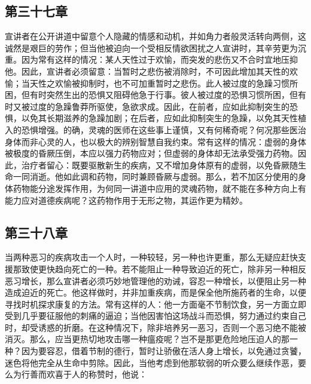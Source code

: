 
\subsection{第三十七章}

\par

宣讲者在公开讲道中留意个人隐藏的情感和动机，并如角力者般灵活转向两侧，这诚然是艰巨的劳作；但当他被迫向一个受相反情欲困扰之人宣讲时，其辛劳更为沉重。因为常有这样的情况：某人天性过于欢愉，而突发的悲伤又不合时宜地压抑他。因此，宣讲者必须留意：当暂时之悲伤被消除时，不可因此增加其天性的欢愉；当天性之欢愉被抑制时，也不可加重暂时之悲伤。此人被过度的急躁习惯所困，但有时突然生出的恐惧又阻碍他急于行事。彼人被过度的恐惧习惯所困，但有时又被过度的急躁鲁莽所驱使，急欲求成。因此，在前者，应如此抑制突生的恐惧，以免其长期滋养的急躁加剧；在后者，应如此抑制突生的急躁，以免其天性植入的恐惧增强。的确，灵魂的医师在这些事上谨慎，又有何稀奇呢？何况那些医治身体而非心灵的人，也以极大的辨别智慧自我约束。常有这样的情况：虚弱的身体被极度的昏厥压倒，本应以强力药物应对；但虚弱的身体却无法承受强力药物。因此，治疗者留心：既要驱散新生的疾病，又不增加身体原有的虚弱，以免昏厥随生命一同消逝。他如此调和药物，同时兼顾昏厥与虚弱。那么，若不加区分使用的身体药物能分途发挥作用，为何同一讲道中应用的灵魂药物，就不能在多种方向上有能力应对道德疾病呢？这药物作用于无形之物，其运作更为精妙。\par


\subsection{第三十八章}

\par

当两种恶习的疾病攻击一个人时，一种较轻，另一种也许更重，那么无疑应赶快支援那致使更快趋向死亡的一种。若不能阻止一种导致迫近的死亡，除非另一种相反恶习增长，那么宣讲者必须巧妙地管理他的劝诫，容忍一种增长，以便阻止另一种造成迫近的死亡。他这样做时，并非加重疾病，而是保全他所施药者的生命，以便寻找时机探求康复的方法。常有这样的人：他一方面毫不节制饮食，另一方面立即受到几乎要征服他的刺痛的逼迫；当他因害怕这场战斗而恐惧，努力通过约束自己时，却受诱惑的折磨。在这种情况下，除非培养另一恶习，否则一个恶习绝不能被消灭。那么，应当更热切地攻击哪一种瘟疫呢？岂不是那更危险地压迫人的那一种？因为要容忍，借着节制的德行，暂时让骄傲在活人身上增长，以免通过贪饕，迷色将他完全从生命中剪除。因此，当他考虑到他那软弱的听众要么继续作恶，要么为行善而欢喜于人的称赞时，他说：\par

